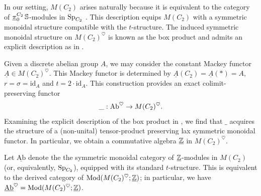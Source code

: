 In our setting, $M(C_2)$ arises naturally because it is equivalent to the category of $\underline{\pi}_0 ^{C_2} \operatorname{\mathbb{S}}$-modules in $\operatorname{\mathrm{Sp}}_{C_2}$ \cite[Theorem 5.10]{SpectrumMackey}.
This description equips $M(C_2)$ with a symmetric monoidal structure compatible with the $t$-structure. The induced symmetric monoidal structure on $M(C_2)^{\heartsuit}$ is known as the box product and admits an explicit description as in \cite{CpBox}.

\begin{exm}
  Given a discrete abelian group $A$, we may consider the constant Mackey functor $\underline{A} \in M(C_2)^{\heartsuit}$. This Mackey functor is determined by $\underline{A} (C_2) = \underline{A} (\ast) = A$, $r = \sigma = \mathrm{id}_{A}$ and $t=2 \cdot \mathrm{id}_{A}$.
  This construction provides an exact colimit-preserving functor
  \[\_ : \mathrm{Ab}^{\heartsuit} \to M(C_2)^{\heartsuit}.\]
  Examining the explicit description of the box product in \cite{CpBox}, we find that $\_$ acquires the structure of a (non-unital) tensor-product preserving lax symmetric monoidal functor.
  In particular, we obtain a commutative algebra $\underline{\mathbb{Z}}$ in $M(C_2)^{\heartsuit}$.
\end{exm}

\begin{dfn}
  Let $\underline{\mathrm{Ab}}$ denote the the symmetric monoidal category of $\underline{\mathbb{Z}}$-modules in $M(C_2)$ (or, equivalently, $\operatorname{\mathrm{Sp}}_{C_2}$), equipped with its standard $t$-structure. This is equivalent to the derived category of $\mathrm{Mod}(M(C_2)^{\heartsuit}; \underline{\mathbb{Z}})$; in particular, we have $\underline{\mathrm{Ab}}^{\heartsuit} = \mathrm{Mod}(M(C_2) ^{\heartsuit}; \underline{\mathbb{Z}})$.
\end{dfn}

